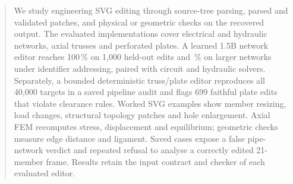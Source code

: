 \begin{abstract}
We study engineering SVG editing through source-tree parsing, parsed and validated patches, and
physical or geometric checks on the recovered output. The evaluated implementations cover electrical and hydraulic networks, axial trusses
and perforated plates. A learned 1.5B network editor reaches 100\,\% on 1,000 held-out edits and
\editOneFiveHard\,\% on larger networks under identifier addressing, paired with circuit and hydraulic
solvers. Separately, a bounded deterministic truss/plate editor reproduces all 40,000 targets in a saved
pipeline audit and flags 699 faithful plate edits that violate clearance rules. Worked SVG examples
show member resizing, load changes, structural topology patches and hole enlargement. Axial FEM
recomputes stress, displacement and equilibrium; geometric checks measure edge distance and ligament.
Saved \astra cases expose a false pipe-network verdict and repeated refusal to analyse a correctly
edited 21-member frame. Results retain the input contract and checker of each evaluated editor.
\end{abstract}

